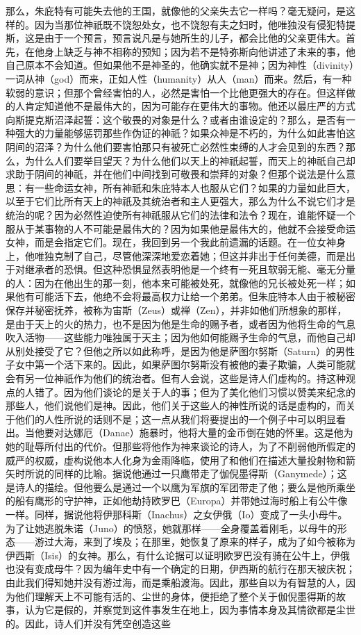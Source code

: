 那么，朱庇特有可能失去他的王国，就像他的父亲失去它一样吗？毫无疑问，是这样的。因为当那位神祇既不饶恕处女，也不饶恕有夫之妇时，他唯独没有侵犯特提斯，这是由于一个预言，预言说凡是与她所生的儿子，都会比他的父亲更伟大。首先，在他身上缺乏与神不相称的预知；因为若不是特弥斯向他讲述了未来的事，他自己原本不会知道。但如果他不是神圣的，他确实就不是神；因为神性（divinity）一词从神（god）而来，正如人性（humanity）从人（man）而来。然后，有一种软弱的意识；但那个曾经害怕的人，必然是害怕一个比他更强大的存在。但这样做的人肯定知道他不是最伟大的，因为可能存在更伟大的事物。他还以最庄严的方式向斯提克斯沼泽起誓：这个敬畏的对象是什么？或者由谁设定的？那么，是否有一种强大的力量能够惩罚那些作伪证的神祇？如果众神是不朽的，为什么如此害怕这阴间的沼泽？为什么他们要害怕那只有被死亡必然性束缚的人才会见到的东西？那么，为什么人们要举目望天？为什么他们以天上的神祇起誓，而天上的神祇自己却求助于阴间的神祇，并在他们中间找到可敬畏和崇拜的对象？但那个说法是什么意思：有一些命运女神，所有神祇和朱庇特本人也服从它们？如果的力量如此巨大，以至于它们比所有天上的神祇及其统治者和主人更强大，那么为什么不说它们才是统治的呢？因为必然性迫使所有神祇服从它们的法律和法令？现在，谁能怀疑一个服从于某事物的人不可能是最伟大的？因为如果他是最伟大的，他就不会接受命运女神，而是会指定它们。现在，我回到另一个我此前遗漏的话题。在一位女神身上，他唯独克制了自己，尽管他深深地爱恋着她；但这并非出于任何美德，而是出于对继承者的恐惧。但这种恐惧显然表明他是一个终有一死且软弱无能、毫无分量的人：因为在他出生的那一刻，他本来可能被处死，就像他的兄长被处死一样；如果他有可能活下去，他绝不会将最高权力让给一个弟弟。但朱庇特本人由于被秘密保存并秘密抚养，被称为宙斯（Zeus）或禅（Zen），并非如他们所想象的那样，是由于天上的火的热力，也不是因为他是生命的赐予者，或者因为他将生命的气息吹入活物——这些能力唯独属于天主；因为他如何能赐予生命的气息，而他自己却从别处接受了它？但他之所以如此称呼，是因为他是萨图尔努斯（Saturn）的男性子女中第一个活下来的。因此，如果萨图尔努斯没有被他的妻子欺骗，人类可能就会有另一位神祇作为他们的统治者。但有人会说，这些是诗人们虚构的。持这种观点的人错了。因为他们谈论的是关于人的事；但为了美化他们习惯以赞美来纪念的那些人，他们说他们是神。因此，他们关于这些人的神性所说的话是虚构的，而关于他们的人性所说的话则不是；这一点从我们将要提出的一个例子中可以明显看出。当他要对达娜厄（Danae）施暴时，他将大量的金币倒在她的怀里。这是他为她的耻辱所付出的代价。但那些将他作为神来谈论的诗人，为了不削弱他所假定的威严的权威，虚构说他本人化身为金雨降临，使用了和他们在描述大量投射物和箭矢时所说的同样的比喻。据说他通过一只鹰带走了伽倪墨得斯（Ganymede）；这是诗人的描绘。但他要么是通过一个以鹰为军旗的军团带走了他；要么是他所乘坐的船有鹰形的守护神，正如他劫持欧罗巴（Europa）并带她过海时船上有公牛像一样。同样，据说他将伊那科斯（Inachus）之女伊俄（Io）变成了一头小母牛。为了让她逃脱朱诺（Juno）的愤怒，她就那样——全身覆盖着刚毛，以母牛的形态——游过大海，来到了埃及；在那里，她恢复了原来的样子，成为了如今被称为伊西斯（Isis）的女神。那么，有什么论据可以证明欧罗巴没有骑在公牛上，伊俄也没有变成母牛？因为编年史中有一个确定的日期，伊西斯的航行在那天被庆祝；由此我们得知她并没有游过海，而是乘船渡海。因此，那些自以为有智慧的人，因为他们理解天上不可能有活的、尘世的身体，便拒绝了整个关于伽倪墨得斯的故事，认为它是假的，并察觉到这件事发生在地上，因为事情本身及其情欲都是尘世的。因此，诗人们并没有凭空创造这些